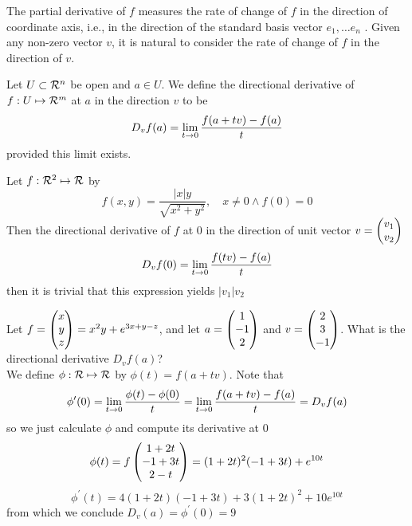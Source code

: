 The partial derivative of $f$ measures the rate of change of $f$ in the direction of coordinate axis, i.e., in the direction of the standard basis vector $e_{1}, \dots e_{n}$
. Given any non-zero vector $v$, it is natural to consider the rate of change of $f$ in the direction of $v$.

\begin{definition}
    Let $U \subset \mathcal{R}^{n}$ be open and $a \in U$. We define the directional derivative of $f: U \mapsto \mathcal{R}^{m}$ at $a$ in the direction $v$ to be 
    $$D_{v}f(a) = \lim\limits_{t \to 0}\frac{f(a+tv) - f(a)}{t}$$ 
    provided this limit exists.
\end{definition}
    
\begin{eg}
    Let $f: \mathcal{R}^{2} \mapsto \mathcal{R}$ by $$f(x,y) = \frac{|x|y}{\sqrt{x^{2}+y^{2}}}, \quad x \neq 0 \wedge f(0) = 0$$
    Then the directional derivative of $f$ at $0$ in the direction of unit vector $v = \begin{pmatrix}v_{1}\\v_{2}\end{pmatrix}$
    $$D_{v}f(0) = \lim\limits_{t \to 0}\frac{f(tv) - f(a)}{t}$$
    then it is trivial that this expression yields $|v_{1}|v_{2}$
\end{eg}
\begin{eg}
    Let $f = \begin{pmatrix}x\\y\\z\end{pmatrix} = x^{2}y + e^{3x+y-z}$, and let $a = \begin{pmatrix}1\\-1\\2\end{pmatrix}$ and $v = \begin{pmatrix}2\\3\\-1\end{pmatrix}$. What is the directional derivative $D_{v}f(a)$?
    \\
    We define $\phi: \mathcal{R} \mapsto \mathcal{R}$ by $\phi(t) = f(a+tv)$. Note that $$\phi^{\prime}(0) = \lim\limits_{t \to 0}\frac{\phi(t) - \phi(0)}{t} = \lim\limits_{t \to 0}\frac{f(a+tv)-f(a)}{t} = D_{v}f(a)$$
    so we just calculate $\phi$ and compute its derivative at $0$
    $$\phi(t) = f\begin{pmatrix}1+2t\\-1+3t\\2-t\end{pmatrix} = (1+2t)^{2}(-1+3t)+e^{10t}$$
    $$\phi^{\prime}(t) = 4(1+2t)(-1+3t)+3(1+2t)^{2} + 10e^{10t}$$
    from which we conclude $D_{v}(a) = \phi^{\prime}(0) = 9$
\end{eg}

\pagebreak
